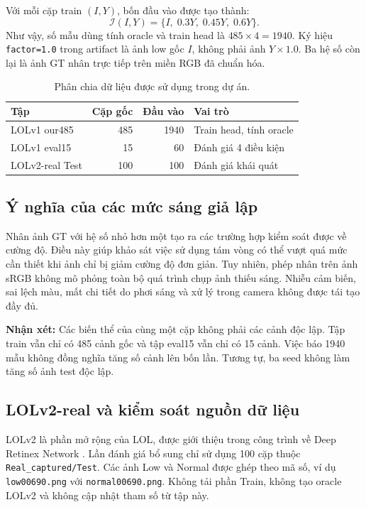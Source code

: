 Với mỗi cặp train $(I,Y)$, bốn đầu vào được tạo thành:
\begin{equation}
\mathcal{I}(I,Y)=\{I,\;0.3Y,\;0.45Y,\;0.6Y\}.
\end{equation}
Như vậy, số mẫu dùng tính oracle và train head là $485\times4=1940$. Ký hiệu \texttt{factor=1.0} trong artifact là ảnh low gốc $I$, không phải ảnh $Y\times1.0$. Ba hệ số còn lại là ảnh GT nhân trực tiếp trên miền RGB đã chuẩn hóa.

\begin{table}[H]\centering
\caption{Phân chia dữ liệu được sử dụng trong dự án.}
\begin{tabular}{lrrl}\toprule
Tập & Cặp gốc & Đầu vào & Vai trò\\\midrule
LOLv1 our485 & 485 & 1940 & Train head, tính oracle\\
LOLv1 eval15 & 15 & 60 & Đánh giá 4 điều kiện\\
LOLv2-real Test & 100 & 100 & Đánh giá khái quát\\\bottomrule
\end{tabular}
\end{table}

\subsection{Ý nghĩa của các mức sáng giả lập}
Nhân ảnh GT với hệ số nhỏ hơn một tạo ra các trường hợp kiểm soát được về cường độ. Điều này giúp khảo sát việc sử dụng tám vòng có thể vượt quá mức cần thiết khi ảnh chỉ bị giảm cường độ đơn giản. Tuy nhiên, phép nhân trên ảnh sRGB không mô phỏng toàn bộ quá trình chụp ảnh thiếu sáng. Nhiễu cảm biến, sai lệch màu, mất chi tiết do phơi sáng và xử lý trong camera không được tái tạo đầy đủ.

\textbf{Nhận xét:} Các biến thể của cùng một cặp không phải các cảnh độc lập. Tập train vẫn chỉ có 485 cảnh gốc và tập eval15 vẫn chỉ có 15 cảnh. Việc báo 1940 mẫu không đồng nghĩa tăng số cảnh lên bốn lần. Tương tự, ba seed không làm tăng số ảnh test độc lập.

\subsection{LOLv2-real và kiểm soát nguồn dữ liệu}
LOLv2 là phần mở rộng của LOL, được giới thiệu trong công trình về Deep Retinex Network \cite{lolv2}. Lần đánh giá bổ sung chỉ sử dụng 100 cặp thuộc \texttt{Real\_captured/Test}. Các ảnh Low và Normal được ghép theo mã số, ví dụ \texttt{low00690.png} với \texttt{normal00690.png}. Không tải phần Train, không tạo oracle LOLv2 và không cập nhật tham số từ tập này.

